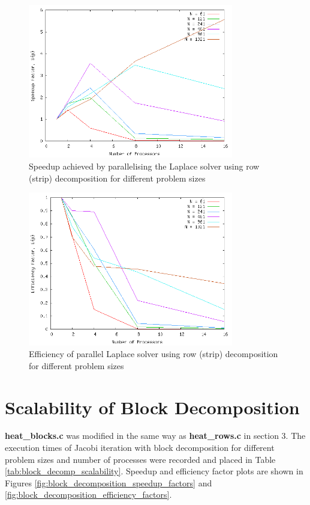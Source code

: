\documentclass{article}
\begin{document}
\begin{figure}
	\centering
	\includegraphics[width=0.8\textwidth]{task3/task3_row_speedups.png}
	\caption{Speedup achieved by parallelising the Laplace solver using row (strip) decomposition for different problem sizes}
	\label{fig:row_decomposition_speedup_factors}
\end{figure}

\begin{figure}
	\centering
	\includegraphics[width=0.8\textwidth]{task3/task3_row_efficiencies.png}
	\caption{Efficiency of parallel Laplace solver using row (strip) decomposition for different problem sizes}
	\label{fig:row_decomposition_efficiency_factors}
\end{figure}


\section{Scalability of Block Decomposition}

\textbf{heat\_blocks.c} was modified in the same way as \textbf{heat\_rows.c} in section 3. The execution times of Jacobi iteration with block decomposition for different problem sizes and number of processes were recorded and placed in Table \ref{tab:block_decomp_scalability}. Speedup and efficiency factor plots are shown in Figures \ref{fig:block_decomposition_speedup_factors} and \ref{fig:block_decomposition_efficiency_factors}.
\end{document}
